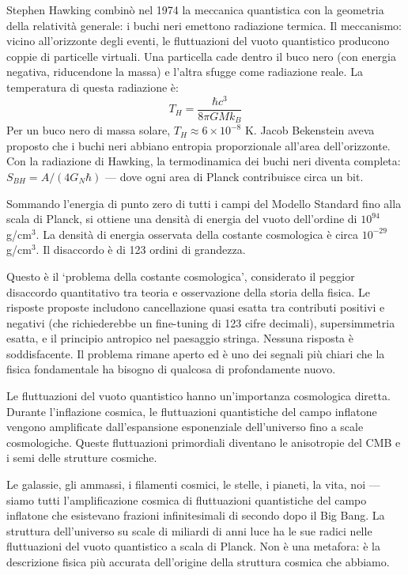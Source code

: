 \documentclass[12pt,a4paper,openany]{book}
\newcommand{\sezione}[1]{\vspace{1.2em}{\large\bfseries #1}\vspace{0.5em}\par}
\begin{document}
\sezione{La radiazione di Hawking e la termodinamica dei buchi neri}

Stephen Hawking combinò nel 1974 la meccanica quantistica con la geometria della relatività generale: i buchi neri emettono radiazione termica. Il meccanismo: vicino all'orizzonte degli eventi, le fluttuazioni del vuoto quantistico producono coppie di particelle virtuali. Una particella cade dentro il buco nero (con energia negativa, riducendone la massa) e l'altra sfugge come radiazione reale. La temperatura di questa radiazione è:
\[
T_H = \frac{\hbar c^3}{8\pi G M k_B}
\]
Per un buco nero di massa solare, $T_H \approx 6 \times 10^{-8}$ K. Jacob Bekenstein aveva proposto che i buchi neri abbiano entropia proporzionale all'area dell'orizzonte. Con la radiazione di Hawking, la termodinamica dei buchi neri diventa completa: $S_{BH} = A/(4G_N\hbar)$ — dove ogni area di Planck contribuisce circa un bit.

\sezione{Il problema della costante cosmologica}

Sommando l'energia di punto zero di tutti i campi del Modello Standard fino alla scala di Planck, si ottiene una densità di energia del vuoto dell'ordine di $10^{94}$ g/cm$^3$. La densità di energia osservata della costante cosmologica è circa $10^{-29}$ g/cm$^3$. Il disaccordo è di 123 ordini di grandezza.

Questo è il `problema della costante cosmologica', considerato il peggior disaccordo quantitativo tra teoria e osservazione della storia della fisica. Le risposte proposte includono cancellazione quasi esatta tra contributi positivi e negativi (che richiederebbe un fine-tuning di 123 cifre decimali), supersimmetria esatta, e il principio antropico nel paesaggio stringa. Nessuna risposta è soddisfacente. Il problema rimane aperto ed è uno dei segnali più chiari che la fisica fondamentale ha bisogno di qualcosa di profondamente nuovo.

\sezione{Fluttuazioni inflazionarie: dal vuoto alla struttura cosmica}

Le fluttuazioni del vuoto quantistico hanno un'importanza cosmologica diretta. Durante l'inflazione cosmica, le fluttuazioni quantistiche del campo inflatone vengono amplificate dall'espansione esponenziale dell'universo fino a scale cosmologiche. Queste fluttuazioni primordiali diventano le anisotropie del CMB e i semi delle strutture cosmiche.

Le galassie, gli ammassi, i filamenti cosmici, le stelle, i pianeti, la vita, noi — siamo tutti l'amplificazione cosmica di fluttuazioni quantistiche del campo inflatone che esistevano frazioni infinitesimali di secondo dopo il Big Bang. La struttura dell'universo su scale di miliardi di anni luce ha le sue radici nelle fluttuazioni del vuoto quantistico a scala di Planck. Non è una metafora: è la descrizione fisica più accurata dell'origine della struttura cosmica che abbiamo.
\end{document}
